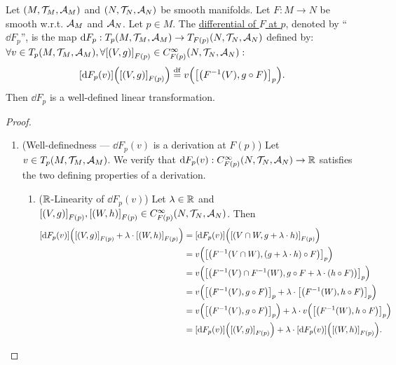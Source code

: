 \documentclass[11pt,reqno]{amsart}
\begin{document}
\begin{Thm}\label{thm:differential}
Let $(M,\mathcal{T}_M,\mathcal{A}_M)$ and $(N,\mathcal{T}_N,\mathcal{A}_N)$ be smooth manifolds.
Let $F:M\to N$ be smooth w.r.t. $\mathcal{A}_M$ and $\mathcal{A}_N$.
Let $p\in M$.
The \ul{differential of $F$ at $p$}, denoted by ``$\dd F_p$'',
is the map
$\mathrm{d} F_p:T_p(M,\mathcal{T}_M,\mathcal{A}_M)\to T_{F(p)}(N,\mathcal{T}_N,\mathcal{A}_N)$
defined by:\\
$
\forall v\in T_p(M,\T_M,\A_M),
\forall \SqBr{(V,g)}_{F(p)}\in C_{F(p)}^\infty(N,\T_N,\A_N):
$
\[
\FUNC{\dd F_p(v)}{\SqBr{(V,g)}_{F(p)}}\df
v\Br{\SqBr{\Br{F\inv(V),g\circ F}}_p}.
\]
Then $\dd F_p$ is a well-defined linear transformation.
\end{Thm}
\begin{proof}
\begin{enumerate}
\item (Well-definedness — $\dd F_p(v)$ is a derivation at $F(p)$)
Let $v\in T_p(M,\mathcal{T}_M,\mathcal{A}_M)$.
We verify that $\mathrm{d} F_p(v):C_{F(p)}^\infty(N,\mathcal{T}_N,\mathcal{A}_N)\to\mathbb{R}$
satisfies the two defining properties of a derivation.

\begin{enumerate}
\item ($\mathbb{R}$-Linearity of $\dd F_p(v)$)
Let $\lambda\in\mathbb{R}$ and
$\SqBr{(V,g)}_{F(p)},\SqBr{(W,h)}_{F(p)}\in C_{F(p)}^\infty(N,\T_N,\A_N)$.
Then
\[\begin{aligned}
\FUNC{\dd F_p(v)}{\SqBr{(V,g)}_{F(p)}+\lambda\cdot\SqBr{(W,h)}_{F(p)}}
&=\FUNC{\dd F_p(v)}{\SqBr{\Br{V\cap W,g+\lambda\cdot h}}_{F(p)}}\\
&=v\Br{\SqBr{\Br{F\inv(V\cap W),(g+\lambda\cdot h)\circ F}}_p}\\
&=v\Br{\SqBr{\Br{F\inv(V)\cap F\inv(W),g\circ F+\lambda\cdot(h\circ F)}}_p}\\
&=v\Br{\SqBr{\Br{F\inv(V),g\circ F}}_p
+\lambda\cdot\SqBr{\Br{F\inv(W),h\circ F}}_p}\\
&=v\Br{\SqBr{\Br{F\inv(V),g\circ F}}_p}
+\lambda\cdot v\Br{\SqBr{\Br{F\inv(W),h\circ F}}_p}\\
&=\FUNC{\dd F_p(v)}{\SqBr{(V,g)}_{F(p)}}
+\lambda\cdot\FUNC{\dd F_p(v)}{\SqBr{(W,h)}_{F(p)}}.
\end{aligned}\]


\end{enumerate}
\end{enumerate}
\end{proof}
\end{document}
